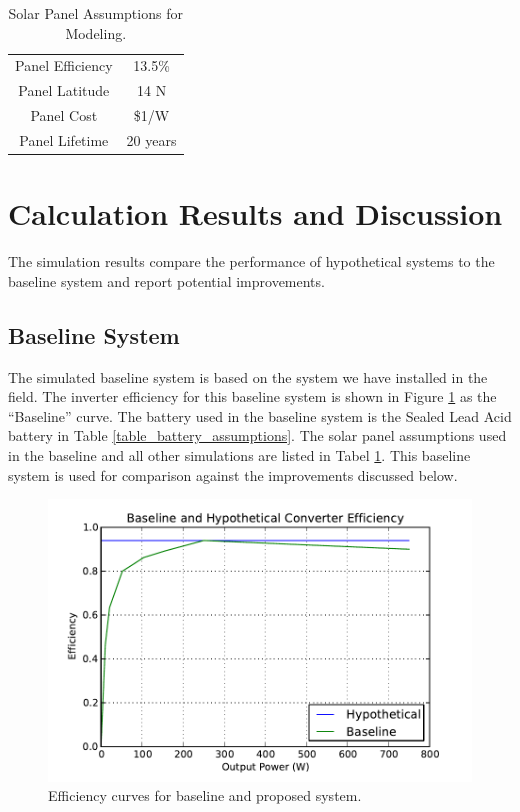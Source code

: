 \documentclass[conference]{IEEEtran}
\begin{document}
\begin{table}
\centering
\begin{tabular}{ c c }
Panel Efficiency       & 13.5\% \\
Panel Latitude         & 14 N  \\ 
Panel Cost             & \$1/W  \\
Panel Lifetime         & 20 years \\
\end{tabular}
\caption{Solar Panel Assumptions for Modeling.}
\label{table_panel_assumptions}
\end{table}


\section{Calculation Results and Discussion}

The simulation results compare the performance of hypothetical
systems to the baseline system and report potential improvements.

\subsection{Baseline System}
The simulated baseline system is based on the system we have
installed in the field.
The inverter efficiency for this baseline system is shown in Figure
\ref{inverter_curves} as the ``Baseline'' curve.
The battery used in the baseline system is the Sealed Lead Acid
battery in Table \ref{table_battery_assumptions}.
The solar panel assumptions used in the baseline and all other
simulations are listed in Tabel \ref{table_panel_assumptions}.
This baseline system is used for comparison against the
improvements discussed below.

\begin{figure}[]
\begin{center}
\includegraphics[width=\columnwidth]{figures/inverter_curves.pdf}
\end{center}
\caption{Efficiency curves for baseline and proposed system.}
\label{inverter_curves}
\end{figure}
\end{document}
